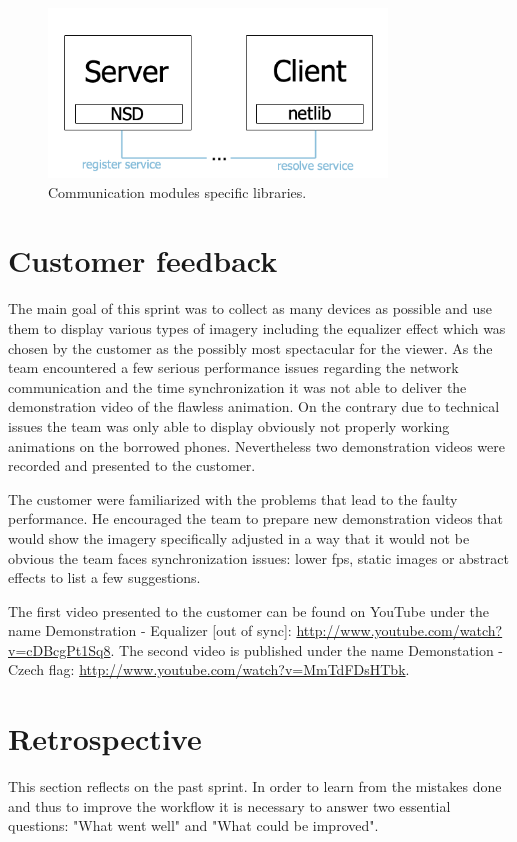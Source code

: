 \begin{figure}[H]
	\centering
		\includegraphics[width=9cm]{sprint5/com.png}
	\caption{Communication modules specific libraries.}
	\label{fig:Communication modules }
\end{figure}

\section{Customer feedback} \label{txt:sprint5_customerfeedback}
The main goal of this sprint was to collect as many devices as possible and use them to display various types of imagery including the equalizer effect which was chosen by the customer as the possibly most spectacular for the viewer. As the team encountered a few serious performance issues regarding the network communication and the time synchronization it was not able to deliver the demonstration video of the flawless animation. On the contrary due to technical issues the team was only able to display obviously not properly working animations on the borrowed phones. Nevertheless two demonstration videos were recorded and presented to the customer.

The customer were familiarized with the problems that lead to the faulty performance. He encouraged the team to prepare new demonstration videos that would show the imagery specifically adjusted in a way that it would not be obvious the team faces synchronization issues: lower fps, static images or abstract effects to list a few suggestions.

The first video presented to the customer can be found on YouTube under the name Demonstration - Equalizer [out of sync]: \url{http://www.youtube.com/watch?v=cDBcgPt1Sq8}. The second video is published under the name Demonstation - Czech flag: \url{http://www.youtube.com/watch?v=MmTdFDsHTbk}.

\section{Retrospective}
This section reflects on the past sprint. In order to learn from the mistakes done and thus to improve the workflow it is necessary to answer two essential questions: "What went well" and "What could be improved".

